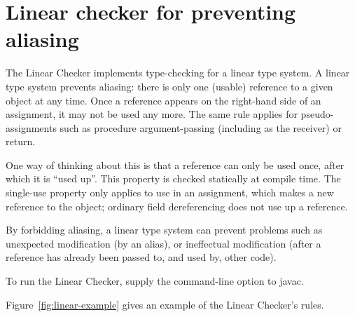 \htmlhr
\chapter{Linear checker for preventing aliasing\label{linear-checker}}

The Linear Checker implements type-checking for a linear type system.  A
linear type system prevents aliasing:  there is only one (usable) reference
to a given object at any time.  Once a reference appears on the right-hand
side of an assignment, it may not be used any more.  The same rule applies
for pseudo-assignments such as procedure argument-passing (including as the
receiver) or return.

One way of thinking about this is that a reference can only be used once,
after which it is ``used up''.  This property is checked statically at
compile time.  The single-use property only applies to use in an
assignment, which makes a new reference to the object; ordinary field
dereferencing does not use up a reference.

By forbidding aliasing, a linear type system can prevent problems such as
unexpected modification (by an alias), or ineffectual modification (after a
reference has already been passed to, and used by, other code).




To run the Linear Checker, supply the  command-line option to javac.


Figure~\ref{fig:linear-example} gives an example of the Linear Checker's rules.

